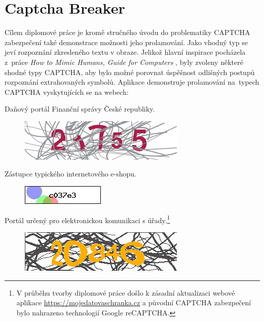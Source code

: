 \documentclass[
  field=ainfp,
  master=true,
  biblatex,
  sourcecodes=false,
  theorems=false,
  glossaries,
  index
]{kidiplom}
\begin{document}
\section{Captcha Breaker}
Cílem diplomové práce je kromě stručného úvodu do problematiky CAPTCHA zabezpečení také demonstrace možnosti jeho prolamování. Jako vhodný typ se jeví rozpoznání zkresleného textu v obraze. Jelikož hlavní inspirace pocházela z~práce \textit{How to Mimic Humans, Guide for Computers} \cite{Kopp2016HowTM}, byly zvoleny některé shodné typy CAPTCHA, aby bylo možné porovnat úspěšnost odlišných postupů rozpoznání extrahovaných symbolů. Aplikace demonstruje prolamování na~typech CAPTCHA vyskytujících se na webech:
\begin{description}[align=left]
\item [\href{https://adiseet.mfcr.cz}{adiseet.mfcr.cz}] Daňový portál Finanční správy České republiky.
\begin{figure}[H]
  \centering
  \includegraphics[scale=0.5]{images/eet.png}
\end{figure}

\item [\href{https://kamody.cz}{kamody.cz}] Zástupce typického internetového e-shopu.
\begin{figure}[H]
  \centering
  \includegraphics{images/kamody.jpg}
\end{figure}

\item [\href{https://mojedatovaschranka.cz}{mojedatovaschranka.cz}] Portál určený pro elektronickou komunikaci s úřady.\footnote{V průběhu tvorby diplomové práce došlo k zásadní aktualizaci webové aplikace \url{https://mojedatovaschranka.cz} a původní CAPTCHA zabezpečení bylo nahrazeno technologií Google reCAPTCHA.}
\begin{figure}[H]
  \centering
  \includegraphics[scale=0.5]{images/datovka.png}
\end{figure}


\end{description}
\end{document}
